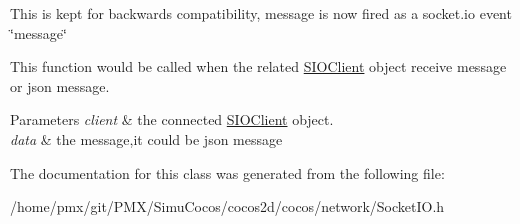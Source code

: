 This is kept for backwards compatibility, message is now fired as a socket.\+io event \char`\"{}message\char`\"{}

This function would be called when the related \hyperlink{classnetwork_1_1SIOClient}{S\+I\+O\+Client} object receive message or json message.


\begin{DoxyParams}{Parameters}
{\em client} & the connected \hyperlink{classnetwork_1_1SIOClient}{S\+I\+O\+Client} object. \\
\hline
{\em data} & the message,it could be json message \\
\hline
\end{DoxyParams}


The documentation for this class was generated from the following file\+:\begin{DoxyCompactItemize}
\item 
/home/pmx/git/\+P\+M\+X/\+Simu\+Cocos/cocos2d/cocos/network/Socket\+I\+O.\+h\end{DoxyCompactItemize}
